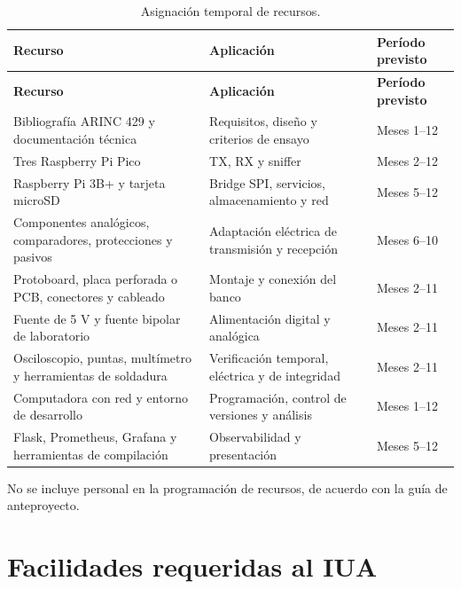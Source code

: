 \documentclass[12pt,a4paper,oneside]{article}
\begin{document}
\begin{longtable}{>{\raggedright\arraybackslash}p{4.0cm}>{\raggedright\arraybackslash}p{6.2cm}>{\raggedright\arraybackslash}p{3.0cm}}
  \caption{Asignación temporal de recursos.}\label{tab:recursos}\\
  \toprule
  \textbf{Recurso} & \textbf{Aplicación} & \textbf{Período previsto} \\
  \midrule
  \endfirsthead
  \toprule
  \textbf{Recurso} & \textbf{Aplicación} & \textbf{Período previsto} \\
  \midrule
  \endhead
  Bibliografía ARINC 429 y documentación técnica & Requisitos, diseño y criterios de ensayo & Meses 1--12 \\
  Tres Raspberry Pi Pico & TX, RX y sniffer & Meses 2--12 \\
  Raspberry Pi 3B+ y tarjeta microSD & Bridge SPI, servicios, almacenamiento y red & Meses 5--12 \\
  Componentes analógicos, comparadores, protecciones y pasivos & Adaptación eléctrica de transmisión y recepción & Meses 6--10 \\
  Protoboard, placa perforada o PCB, conectores y cableado & Montaje y conexión del banco & Meses 2--11 \\
  Fuente de 5 V y fuente bipolar de laboratorio & Alimentación digital y analógica & Meses 2--11 \\
  Osciloscopio, puntas, multímetro y herramientas de soldadura & Verificación temporal, eléctrica y de integridad & Meses 2--11 \\
  Computadora con red y entorno de desarrollo & Programación, control de versiones y análisis & Meses 1--12 \\
  Flask, Prometheus, Grafana y herramientas de compilación & Observabilidad y presentación & Meses 5--12 \\
  \bottomrule
\end{longtable}

No se incluye personal en la programación de recursos, de acuerdo con la guía de anteproyecto.

\section{Facilidades requeridas al IUA}
\end{document}
